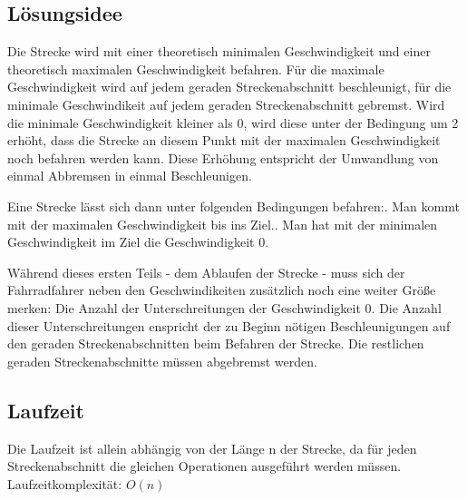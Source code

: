 \subsection {Lösungsidee}
	Die Strecke wird mit einer theoretisch minimalen Geschwindigkeit und einer theoretisch maximalen Geschwindigkeit befahren. 
	Für die maximale Geschwindigkeit wird auf jedem geraden Streckenabschnitt beschleunigt, für die minimale Geschwindikeit auf
	jedem geraden Streckenabschnitt gebremst. Wird die minimale Geschwindigkeit kleiner als 0, wird diese unter der Bedingung um 2 erhöht, 
	dass die Strecke an diesem Punkt mit der maximalen Geschwindigkeit noch befahren werden kann. 
	Diese Erhöhung entspricht der Umwandlung von einmal Abbremsen in einmal Beschleunigen.
	
	Eine Strecke lässt sich dann unter folgenden Bedingungen befahren:. Man kommt mit der maximalen Geschwindigkeit bis ins Ziel.. Man hat mit der minimalen Geschwindigkeit im Ziel die Geschwindigkeit 0.

	Während dieses ersten Teils - dem Ablaufen der Strecke - muss sich der Fahrradfahrer neben den Geschwindikeiten zusätzlich noch
	eine weiter Größe merken: Die Anzahl der Unterschreitungen der Geschwindigkeit 0. Die Anzahl dieser Unterschreitungen enspricht
	der zu Beginn nötigen Beschleunigungen auf den geraden Streckenabschnitten beim Befahren der Strecke. Die restlichen geraden Streckenabschnitte müssen abgebremst werden.
\subsection{Laufzeit}
	Die Laufzeit ist allein abhängig von der Länge n der Strecke, da für jeden Streckenabschnitt die gleichen Operationen ausgeführt werden müssen. Laufzeitkomplexität: \(O(n)\)
